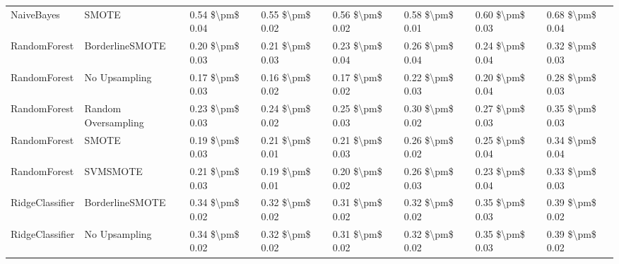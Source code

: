 \begin{tabular}{llllllll}
                     NaiveBayes &                         SMOTE & 0.54 \$\textbackslash pm\$ 0.04 &           0.55 \$\textbackslash pm\$ 0.02 &       0.56 \$\textbackslash pm\$ 0.02 &        0.58 \$\textbackslash pm\$ 0.01 &                         0.60 \$\textbackslash pm\$ 0.03 & 0.68 \$\textbackslash pm\$ 0.04 \\
                   RandomForest &               BorderlineSMOTE & 0.20 \$\textbackslash pm\$ 0.03 &           0.21 \$\textbackslash pm\$ 0.03 &       0.23 \$\textbackslash pm\$ 0.04 &        0.26 \$\textbackslash pm\$ 0.04 &                         0.24 \$\textbackslash pm\$ 0.04 & 0.32 \$\textbackslash pm\$ 0.03 \\
                   RandomForest &                 No Upsampling & 0.17 \$\textbackslash pm\$ 0.03 &           0.16 \$\textbackslash pm\$ 0.02 &       0.17 \$\textbackslash pm\$ 0.02 &        0.22 \$\textbackslash pm\$ 0.03 &                         0.20 \$\textbackslash pm\$ 0.04 & 0.28 \$\textbackslash pm\$ 0.03 \\
                   RandomForest &           Random Oversampling & 0.23 \$\textbackslash pm\$ 0.03 &           0.24 \$\textbackslash pm\$ 0.02 &       0.25 \$\textbackslash pm\$ 0.03 &        0.30 \$\textbackslash pm\$ 0.02 &                         0.27 \$\textbackslash pm\$ 0.03 & 0.35 \$\textbackslash pm\$ 0.03 \\
                   RandomForest &                         SMOTE & 0.19 \$\textbackslash pm\$ 0.03 &           0.21 \$\textbackslash pm\$ 0.01 &       0.21 \$\textbackslash pm\$ 0.03 &        0.26 \$\textbackslash pm\$ 0.02 &                         0.25 \$\textbackslash pm\$ 0.04 & 0.34 \$\textbackslash pm\$ 0.04 \\
                   RandomForest &                      SVMSMOTE & 0.21 \$\textbackslash pm\$ 0.03 &           0.19 \$\textbackslash pm\$ 0.01 &       0.20 \$\textbackslash pm\$ 0.02 &        0.26 \$\textbackslash pm\$ 0.03 &                         0.23 \$\textbackslash pm\$ 0.04 & 0.33 \$\textbackslash pm\$ 0.03 \\
                RidgeClassifier &               BorderlineSMOTE & 0.34 \$\textbackslash pm\$ 0.02 &           0.32 \$\textbackslash pm\$ 0.02 &       0.31 \$\textbackslash pm\$ 0.02 &        0.32 \$\textbackslash pm\$ 0.02 &                         0.35 \$\textbackslash pm\$ 0.03 & 0.39 \$\textbackslash pm\$ 0.02 \\
                RidgeClassifier &                 No Upsampling & 0.34 \$\textbackslash pm\$ 0.02 &           0.32 \$\textbackslash pm\$ 0.02 &       0.31 \$\textbackslash pm\$ 0.02 &        0.32 \$\textbackslash pm\$ 0.02 &                         0.35 \$\textbackslash pm\$ 0.03 & 0.39 \$\textbackslash pm\$ 0.02 \\

\end{tabular}

